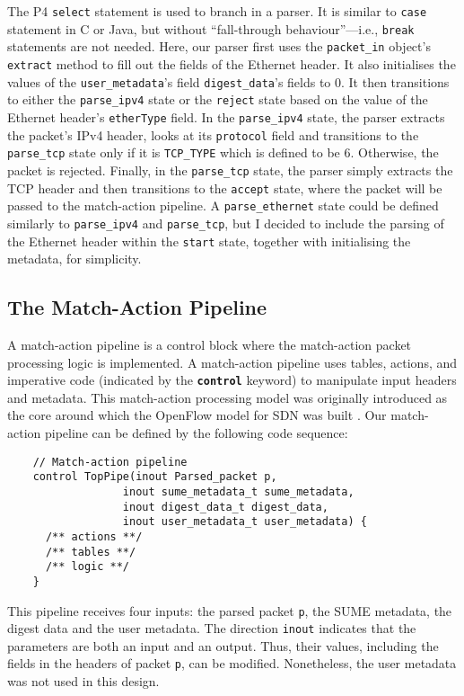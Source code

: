 The P4 \texttt{select} statement is used to branch in a parser. It is similar to \texttt{case} statement in C or Java, but without ``fall-through behaviour''---i.e., \texttt{break} statements are not needed. Here, our parser first uses the \verb|packet_in| object's \texttt{extract} method to fill out the fields of the Ethernet header. It also initialises the values of the \verb|user_metadata|'s field \verb|digest_data|'s fields to 0. It then transitions to either the \verb|parse_ipv4| state or the \texttt{reject} state based on the value of the Ethernet header’s \texttt{etherType} field. In the \texttt{parse\_ipv4} state, the parser extracts the packet's IPv4 header, looks at its \texttt{protocol} field and transitions to the \texttt{parse\_tcp} state only if it is \texttt{TCP\_TYPE} which is defined to be 6. Otherwise, the packet is rejected. Finally, in the \texttt{parse\_tcp} state, the parser simply extracts the TCP header and then transitions to the \texttt{accept} state, where the packet will be passed to the match-action pipeline. A \texttt{parse\_ethernet} state could be defined similarly to \verb|parse_ipv4| and \verb|parse_tcp|, but I decided to include the parsing of the Ethernet header within the \texttt{start} state, together with initialising the metadata, for simplicity.
		
	\subsection{The Match-Action Pipeline}
A match-action pipeline is a control block where the match-action packet processing logic is implemented. A match-action pipeline uses tables, actions, and imperative code (indicated by the \textbf{\texttt{control}} keyword) to manipulate input headers and metadata. This match-action processing model was originally introduced as the core around which the OpenFlow model for SDN was built \cite{}. Our match-action pipeline can be defined by the following code sequence:

{\renewcommand{\baselinestretch}{0.8}\small
	\begin{verbatim}
    // Match-action pipeline
    control TopPipe(inout Parsed_packet p,
                  inout sume_metadata_t sume_metadata, 
                  inout digest_data_t digest_data, 
                  inout user_metadata_t user_metadata) {
      /** actions **/
      /** tables **/
      /** logic **/          
    }
	\end{verbatim}
}

This pipeline receives four inputs: the parsed packet \texttt{p}, the SUME metadata, the digest data and the user metadata. The direction \texttt{inout} indicates that the parameters are both an input and an output. Thus, their values, including the fields in the headers of packet \texttt{p}, can be modified. Nonetheless, the user metadata was not used in this design.

